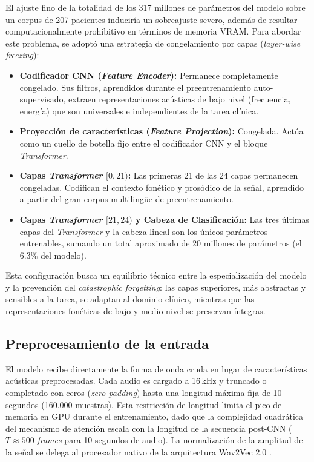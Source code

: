 El ajuste fino de la totalidad de los 317 millones de parámetros del modelo sobre un corpus de 207 pacientes induciría un sobreajuste severo, además de resultar computacionalmente prohibitivo en términos de memoria VRAM. Para abordar este problema, se adoptó una estrategia de congelamiento por capas (\textit{layer-wise freezing}):

\begin{itemize}
    \item \textbf{Codificador CNN (\textit{Feature Encoder}):} Permanece completamente congelado. Sus filtros, aprendidos durante el preentrenamiento auto-supervisado, extraen representaciones acústicas de bajo nivel (frecuencia, energía) que son universales e independientes de la tarea clínica.
    \item \textbf{Proyección de características (\textit{Feature Projection}):} Congelada. Actúa como un cuello de botella fijo entre el codificador CNN y el bloque \textit{Transformer}.
    \item \textbf{Capas \textit{Transformer} $[0, 21)$:} Las primeras 21 de las 24 capas permanecen congeladas. Codifican el contexto fonético y prosódico de la señal, aprendido a partir del gran corpus multilingüe de preentrenamiento.
    \item \textbf{Capas \textit{Transformer} $[21, 24)$ y Cabeza de Clasificación:} Las tres últimas capas del \textit{Transformer} y la cabeza lineal son los únicos parámetros entrenables, sumando un total aproximado de 20 millones de parámetros (el $6.3\%$ del modelo).
\end{itemize}

Esta configuración busca un equilibrio técnico entre la especialización del modelo y la prevención del \textit{catastrophic forgetting}: las capas superiores, más abstractas y sensibles a la tarea, se adaptan al dominio clínico, mientras que las representaciones fonéticas de bajo y medio nivel se preservan íntegras.

\subsection{Preprocesamiento de la entrada}

El modelo recibe directamente la forma de onda cruda en lugar de características acústicas preprocesadas. Cada audio es cargado a 16\,kHz y truncado o completado con ceros (\textit{zero-padding}) hasta una longitud máxima fija de 10 segundos (160.000 muestras). Esta restricción de longitud limita el pico de memoria en GPU durante el entrenamiento, dado que la complejidad cuadrática del mecanismo de atención escala con la longitud de la secuencia post-CNN ($T \approx 500$ \textit{frames} para 10 segundos de audio). La normalización de la amplitud de la señal se delega al procesador nativo de la arquitectura Wav2Vec 2.0 \cite{baevski2020}.

